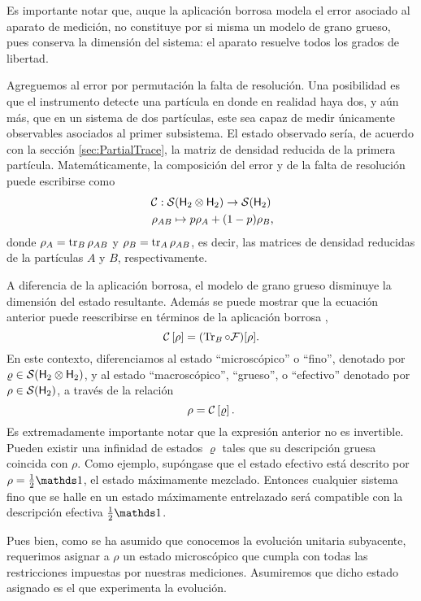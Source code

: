 Es importante notar que, auque la aplicación borrosa modela el error asociado al aparato de medición, no constituye por si misma un modelo de grano grueso, pues conserva la dimensión del sistema: el aparato resuelve todos los grados de libertad.

Agreguemos al error por permutación la falta de resolución. Una posibilidad es que el instrumento detecte una partícula en donde en realidad haya dos, y aún más, que en un sistema de dos partículas, este sea capaz de medir únicamente observables asociados al primer subsistema. El estado observado sería, de acuerdo con la sección \ref{sec:PartialTrace}, la matriz de densidad reducida de la primera partícula. Matemáticamente, la composición del error y de la falta de resolución puede escribirse como
\begin{gather*}
    \mcC:\mcS(\hilbert_2 \otimes \hilbert_2)\to \mcS(\hilbert_2)\nonumber\\
    \rho_{AB} \mapsto p\rho_A+(1-p)\rho_B\rlap{,}
\end{gather*}
donde $\rho_A=\tr_B \rho_{AB}$ y $\rho_B=\tr_A \rho_{AB}$, es decir, las matrices de densidad reducidas de la partículas $A$ y $B$, respectivamente.


A diferencia de la aplicación borrosa, el modelo de grano grueso disminuye la dimensión del estado resultante. Además se puede mostrar que la ecuación anterior puede reescribirse en términos de la aplicación borrosa \cite{FuzzyMeasurements},
\begin{equation}\label{eq:CG}
\mathcal{C}\left[\rho\right]=(\Tr_{B}\circ\mathcal{F})[\rho].
\end{equation}
En este contexto, diferenciamos al estado ``microscópico'' o ``fino'', denotado por $\varrho\in \mathcal{S}({\sf H}_2\otimes{\sf H}_2)$, y al estado ``macroscópico'', ``grueso'', o  ``efectivo'' denotado por $\rho\in \mathcal{S}({\sf H}_2)$, a través de la relación
\begin{equation*}
    \rho=\mathcal{C}\left[\varrho\right].
\end{equation*}
Es extremadamente importante notar que la expresión anterior no es invertible. Pueden existir una infinidad de estados $\varrho$ tales que su descripción gruesa coincida con $\rho$. Como ejemplo, supóngase que el estado efectivo está descrito por $\rho=\frac{1}{2}\Id$, el estado máximamente mezclado. Entonces cualquier sistema fino que se halle en un estado máximamente entrelazado será compatible con la descripción efectiva $\frac{1}{2}\Id$.

Pues bien, como se ha asumido que conocemos la evolución unitaria subyacente, requerimos asignar a $\rho$ un estado microscópico que cumpla con todas las restricciones impuestas por nuestras mediciones. Asumiremos que dicho estado asignado es el que experimenta la evolución. 
